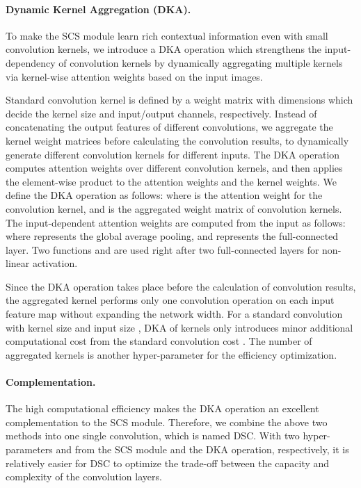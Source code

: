 \documentclass{article}
\begin{document}
\paragraph{Dynamic Kernel Aggregation (DKA).} To make the SCS module learn rich contextual information even with small convolution kernels, we introduce a DKA operation which strengthens the input-dependency of convolution kernels by dynamically aggregating multiple kernels via kernel-wise attention weights based on the input images.

Standard convolution kernel is defined by a weight matrix  with  dimensions which decide the kernel size and input/output channels, respectively. Instead of concatenating the output features of different convolutions, we aggregate the kernel weight matrices  before calculating the convolution results, to dynamically generate different convolution kernels for different inputs. The DKA operation computes attention weights over different convolution kernels, and then applies the element-wise product to the attention weights and the kernel weights. We define the DKA operation as follows:
where  is the attention weight for the  convolution kernel, and  is the aggregated weight matrix of  convolution kernels. The input-dependent attention weights  are computed from the input  as follows:
where  represents the global average pooling, and  represents the full-connected layer. Two functions  and  are used right after two full-connected layers for non-linear activation.

Since the DKA operation takes place before the calculation of convolution results, the aggregated kernel performs only one convolution operation on each input feature map without expanding the network width. For a standard convolution with kernel size  and input size , DKA of  kernels only introduces minor additional computational cost  from the standard convolution cost . The number of aggregated kernels  is another hyper-parameter for the efficiency optimization.

\paragraph{Complementation.} The high computational efficiency makes the DKA operation an excellent complementation to the SCS module. Therefore, we combine the above two methods into one single convolution, which is named DSC. With two hyper-parameters  and  from the SCS module and the DKA operation, respectively, it is relatively easier for DSC to optimize the trade-off between the capacity and complexity of the convolution layers.
\end{document}
